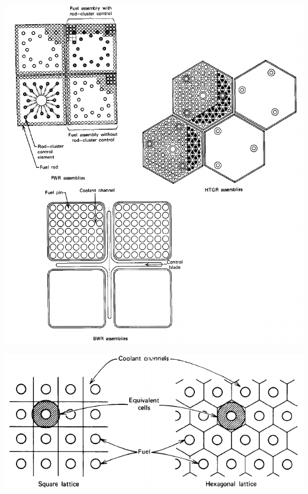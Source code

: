 \documentclass[12pt]{article}
\begin{document}
    \begin{center}
    \includegraphics[keepaspectratio, width=\textwidth]{assembly-types}
    \end{center}

    \begin{center}
    \includegraphics[keepaspectratio, width=\textwidth]{unit-cells}
    \end{center}
\end{document}
